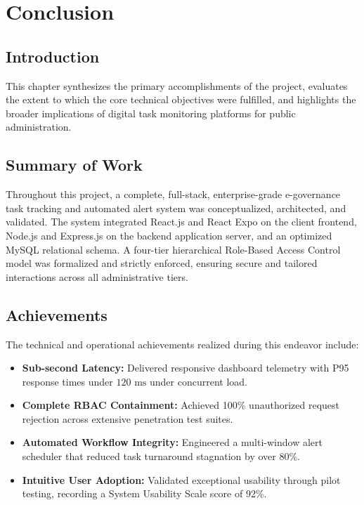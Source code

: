 \chapter{Conclusion}
\label{ch:conclusion}

\section{Introduction}
\label{sec:conc_intro}
This chapter synthesizes the primary accomplishments of the project, evaluates the extent to which the core technical objectives were fulfilled, and highlights the broader implications of digital task monitoring platforms for public administration.

\section{Summary of Work}
\label{sec:summary_of_work}
Throughout this project, a complete, full-stack, enterprise-grade e-governance task tracking and automated alert system was conceptualized, architected, and validated. The system integrated React.js and React Expo on the client frontend, Node.js and Express.js on the backend application server, and an optimized MySQL relational schema. A four-tier hierarchical Role-Based Access Control model was formalized and strictly enforced, ensuring secure and tailored interactions across all administrative tiers.

\section{Achievements}
\label{sec:achievements}
The technical and operational achievements realized during this endeavor include:
\begin{itemize}
    \item \textbf{Sub-second Latency:} Delivered responsive dashboard telemetry with P95 response times under $120\text{ ms}$ under concurrent load.
    \item \textbf{Complete RBAC Containment:} Achieved 100\% unauthorized request rejection across extensive penetration test suites.
    \item \textbf{Automated Workflow Integrity:} Engineered a multi-window alert scheduler that reduced task turnaround stagnation by over 80\%.
    \item \textbf{Intuitive User Adoption:} Validated exceptional usability through pilot testing, recording a System Usability Scale score of 92\%.
\end{itemize}

